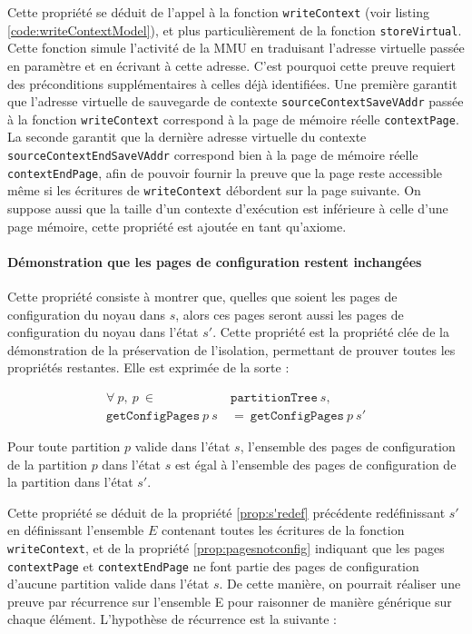 			Cette propriété se déduit de l'appel à la fonction \texttt{writeContext} (voir listing \ref{code:writeContextModel}), et plus particulièrement de la fonction \texttt{storeVirtual}. Cette fonction simule l'activité de la MMU en traduisant l'adresse virtuelle passée en paramètre et en écrivant à cette adresse. C'est pourquoi cette preuve requiert des préconditions supplémentaires à celles déjà identifiées. Une première garantit que l'adresse virtuelle de sauvegarde de contexte \texttt{sourceContextSaveVAddr} passée à la fonction \texttt{writeContext} correspond à la page de mémoire réelle \texttt{contextPage}. La seconde garantit que la dernière adresse virtuelle du contexte \texttt{sourceContextEndSaveVAddr} correspond bien à la page de mémoire réelle \texttt{contextEndPage}, afin de pouvoir fournir la preuve que la page reste accessible même si les écritures de \texttt{writeContext} débordent sur la page suivante. On suppose aussi que la taille d'un contexte d'exécution est inférieure à celle d'une page mémoire, cette propriété est ajoutée en tant qu'axiome.

			\paragraph{Démonstration que les pages de configuration restent inchangées}

			Cette propriété consiste à montrer que, quelles que soient les pages de configuration du noyau dans $s$, alors ces pages seront aussi les pages de configuration du noyau dans l'état $s'$. Cette propriété est la propriété clée de la démonstration de la préservation de l'isolation, permettant de prouver toutes les propriétés restantes. Elle est exprimée de la sorte :

			\begin{align*}
				\forall~p,~p~\in~&\mathtt{partitionTree}~s,\\
				\mathtt{getConfigPages}~p~s~&=~\mathtt{getConfigPages}~p~s'
			\end{align*}

			\begin{theorem}
				\label{prop:sameconfigpages}
				Pour toute partition $p$ valide dans l'état $s$, l'ensemble des pages de configuration de la partition $p$ dans l'état $s$ est égal à l'ensemble des pages de configuration de la partition dans l'état $s'$.
			\end{theorem}

			Cette propriété se déduit de la propriété \ref{prop:s'redef} précédente redéfinissant $s'$ en définissant l'ensemble $E$ contenant toutes les écritures de la fonction \texttt{writeContext}, et de la propriété \ref{prop:pagesnotconfig} indiquant que les pages \texttt{contextPage} et \texttt{contextEndPage} ne font partie des pages de configuration d'aucune partition valide dans l'état $s$.
			De cette manière, on pourrait réaliser une preuve par récurrence sur l'ensemble E pour raisonner de manière générique sur chaque élément. L'hypothèse de récurrence est la suivante :


